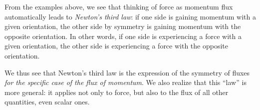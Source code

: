 \documentclass[a4paper,12pt,%
onecolumn,oneside,%
british%
]{memoir}
\newcommand{\langnohyph}[1]{\begin{hyphenrules}{nohyphenation}#1\end{hyphenrules}}
\providecommand{\href}[2]{#2}
\newcommand*{\amp}{\&}
\renewcommand*{\|}[1][]{\nonscript\:#1\vert\nonscript\:\mathopen{}}
\newcommand*{\furl}[2]{\href{#1}{#2}\pagenote{\url{#1}}}
\begin{document}
%
%
From the examples above, we see that thinking of force as momentum flux automatically leads to \emph{Newton's third law}: if one side is gaining momentum with a given orientation, the other side by symmetry is gaining momentum with the opposite orientation. In other words, if one side is experiencing a force with a given orientation, the other side is experiencing a force with the opposite orientation.

We thus see that Newton's third law is the expression of the symmetry of fluxes \emph{for the specific case of the flux of momentum}. We also realize that this \enquote{law} is more general: it applies not only to force, but also to the flux of all other quantities, even scalar ones.


% 
% 
% 
\end{document}
